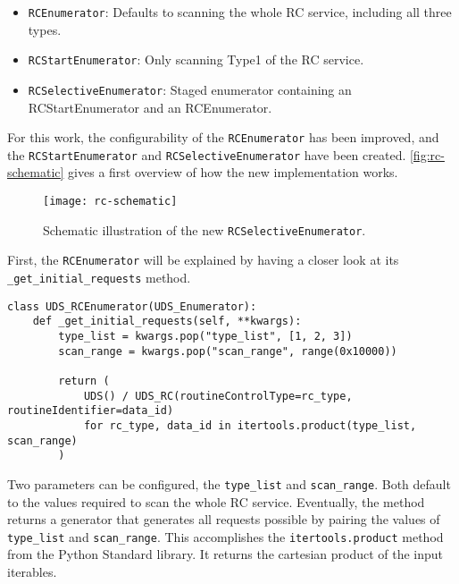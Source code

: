 \begin{itemize}
    \item \texttt{RCEnumerator}: Defaults to scanning the whole RC service, including all three types.
    \item \texttt{RCStartEnumerator}: Only scanning Type1 of the RC service.
    \item \texttt{RCSelectiveEnumerator}: Staged enumerator containing an RCStartEnumerator and an RCEnumerator.
\end{itemize}

For this work, the configurability of the \texttt{RCEnumerator} has been improved, and the \texttt{RCStartEnumerator} and \texttt{RCSelectiveEnumerator} have been created. \autoref{fig:rc-schematic} gives a first overview of how the new implementation works.

\begin{figure}[h]
    \centering
    \texttt{[image: rc-schematic]}
    \caption{Schematic illustration of the new \texttt{RCSelectiveEnumerator}.}
    \label{fig:rc-schematic}
\end{figure}

First, the \texttt{RCEnumerator} will be explained by having a closer look at its \texttt{_get_initial_requests} method.

\begin{samepage}
\begin{verbatim}
class UDS_RCEnumerator(UDS_Enumerator):
    def _get_initial_requests(self, **kwargs):
        type_list = kwargs.pop("type_list", [1, 2, 3])
        scan_range = kwargs.pop("scan_range", range(0x10000))

        return (
            UDS() / UDS_RC(routineControlType=rc_type, routineIdentifier=data_id)
            for rc_type, data_id in itertools.product(type_list, scan_range)
        )
\end{verbatim}
\end{samepage}

Two parameters can be configured, the \texttt{type_list} and \texttt{scan_range}. Both default to the values required to scan the whole RC service. Eventually, the method returns a generator that generates all requests possible by pairing the values of \texttt{type_list} and \texttt{scan_range}. This accomplishes the \texttt{itertools.product} method from the Python Standard library. It returns the cartesian product of the input iterables.

